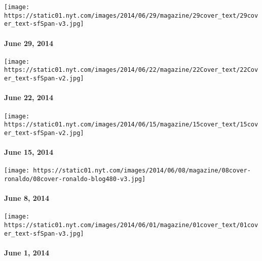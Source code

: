 \href{http://www.nytimes.com/indexes/2014/06/29/magazine/index.html}{}

\texttt{[image: https://static01.nyt.com/images/2014/06/29/magazine/29cover\_text/29cover\_text-sfSpan-v3.jpg]}

\hypertarget{june-29-2014}{%
\paragraph{June 29, 2014}\label{june-29-2014}}

\href{http://www.nytimes.com/indexes/2014/06/22/magazine/index.html}{}

\texttt{[image: https://static01.nyt.com/images/2014/06/22/magazine/22Cover\_text/22Cover\_text-sfSpan-v2.jpg]}

\hypertarget{june-22-2014}{%
\paragraph{June 22, 2014}\label{june-22-2014}}

\href{http://www.nytimes.com/indexes/2014/06/15/magazine/index.html}{}

\texttt{[image: https://static01.nyt.com/images/2014/06/15/magazine/15cover\_text/15cover\_text-sfSpan-v2.jpg]}

\hypertarget{june-15-2014}{%
\paragraph{June 15, 2014}\label{june-15-2014}}

\href{http://www.nytimes.com/indexes/2014/06/08/magazine/index.html}{}

\texttt{[image: https://static01.nyt.com/images/2014/06/08/magazine/08cover-ronaldo/08cover-ronaldo-blog480-v3.jpg]}

\hypertarget{june-8-2014}{%
\paragraph{June 8, 2014}\label{june-8-2014}}

\href{http://www.nytimes.com/indexes/2014/06/01/magazine/index.html}{}

\texttt{[image: https://static01.nyt.com/images/2014/06/01/magazine/01cover\_text/01cover\_text-sfSpan-v3.jpg]}

\hypertarget{june-1-2014}{%
\paragraph{June 1, 2014}\label{june-1-2014}}

